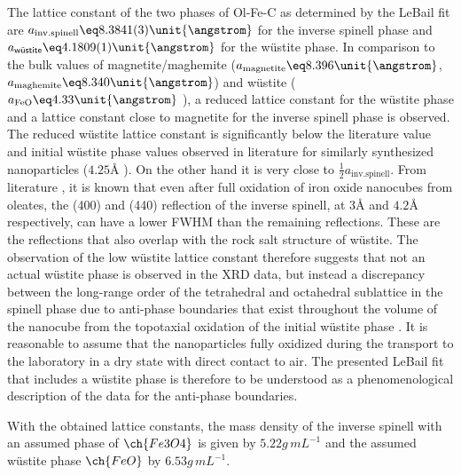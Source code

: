 \documentclass[\main/dresen_thesis.tex]{subfiles}
\begin{document}
  The lattice constant of the two phases of Ol-Fe-C as determined by the LeBail fit are $a_\mathrm{inv. spinell} \eq 8.3841(3) \unit{\angstrom}$ for the inverse spinell phase and $a_\textsf{w\"ustite} \eq 4.1809(1) \unit{\angstrom}$ for the w\"ustite phase.
  In comparison to the bulk values of magnetite/maghemite ($a_\mathrm{magnetite} \eq 8.396 \unit{\angstrom}$, $a_\mathrm{maghemite} \eq 8.340 \unit{\angstrom}$) \cite{Cornell_2003_Their} and w\"ustite ($a_\mathrm{FeO} \eq 4.33 \unit{\angstrom}$ \cite{Hentschel_1970_Stoich}), a reduced lattice constant for the w\"ustite phase and a lattice constant close to magnetite for the inverse spinell phase is observed.
  The reduced w\"ustite lattice constant is significantly below the literature value and initial w\"ustite phase values observed in literature for similarly synthesized nanoparticles ($4.25 \unit{\angstrom}$ \cite{Wetterskog_2013_Anoma}).
  On the other hand it is very close to $\tfrac{1}{2} a_\mathrm{inv. spinell}$.
  From literature \cite{Wetterskog_2013_Anoma}, it is known that even after full oxidation of iron oxide nanocubes from oleates, the (400) and (440) reflection of the inverse spinell, at $3 \unit{\angstrom}$ and $4.2 \unit{\angstrom}$ respectively, can have a lower FWHM than the remaining reflections.
  These are the reflections that also overlap with the rock salt structure of w\"ustite.
  The observation of the low w\"ustite lattice constant therefore suggests that not an actual w\"ustite phase is observed in the XRD data, but instead a discrepancy between the long-range order of the tetrahedral and octahedral sublattice in the spinell phase due to anti-phase boundaries that exist throughout the volume of the nanocube from the topotaxial oxidation of the initial w\"ustite phase \cite{Wetterskog_2013_Anoma}.
  It is reasonable to assume that the nanoparticles fully oxidized during the transport to the laboratory in a dry state with direct contact to air.
  The presented LeBail fit that includes a w\"ustite phase is therefore to be understood as a phenomenological description of the data for the anti-phase boundaries.

  With the obtained lattice constants, the mass density of the inverse spinell with an assumed phase of $\ch{Fe3O4}$ is given by $5.22 \unit{g \, mL^{-1}}$ and the assumed w\"ustite phase $\ch{FeO}$ by $6.53 \unit{g \, mL^{-1}}$.
  \\
\end{document}
